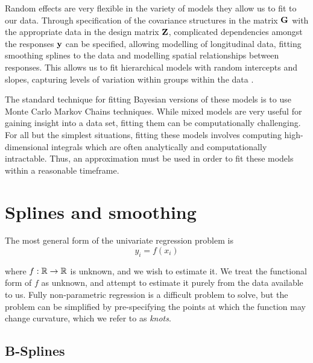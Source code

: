 Random effects are very flexible in the variety of models they allow us to fit to our data. Through
specification of the covariance structures in the matrix ${\bf G}$ with the appropriate data in the design matrix
${\bf Z}$, complicated dependencies amongst the responses ${\bf y}$ can be specified, allowing modelling of
longitudinal data, fitting smoothing splines to the data and modelling spatial relationships between
responses. This allows us to fit hierarchical models with random intercepts and slopes, capturing levels of variation within groups within the data \citep{Gelman2007}.

The standard technique for fitting Bayesian versions of these models is to use Monte Carlo Markov Chains
techniques. While mixed models are very useful for gaining insight into a data set, fitting them can be
computationally challenging. For all but the simplest situations, fitting these models involves computing
high-dimensional integrals which are often analytically and computationally intractable. Thus, an
approximation must be used in order to fit these models within a reasonable timeframe.

\section{Splines and smoothing}
The most general form of the univariate regression problem is
$$
	y_i = f(x_i)
$$

\noindent where $f: {\mathbb{R}} \to {\mathbb{R}}$ is unknown, and we wish to estimate it. We treat the functional form of $f$ as
unknown, and attempt to estimate it purely from the data available to us. Fully non-parametric regression is a
difficult problem to solve, but the problem can be simplified by pre-specifying the points at which the
function may change curvature, which we refer to as \emph{knots}.

\subsection{B-Splines}


